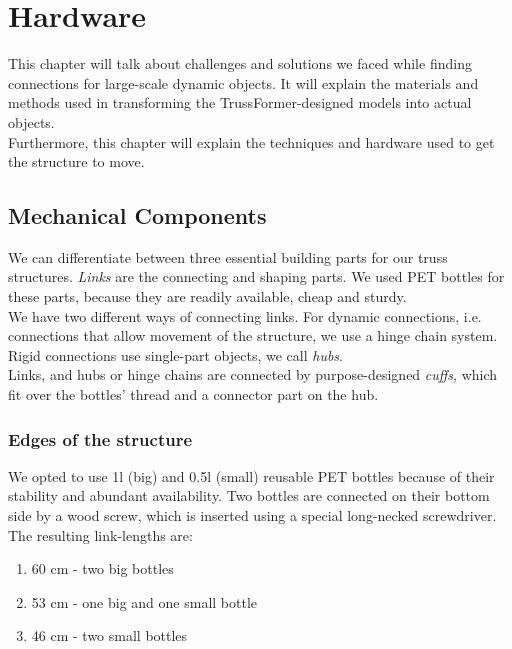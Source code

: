 \chapter{Hardware}\label{ch:hardware}
This chapter will talk about challenges and solutions we faced while finding connections for large-scale dynamic objects. It will explain the materials and methods used in transforming the TrussFormer-designed models into actual objects.\\
Furthermore, this chapter will explain the techniques and hardware used to get the structure to move.

\section{Mechanical Components}
We can differentiate between three essential building parts for our truss structures. \textit{Links} are the connecting and shaping parts. We used PET bottles for these parts, because they are readily available, cheap and sturdy.\\
We have two different ways of connecting links. For dynamic connections, i.e. connections that allow movement of the structure, we use a hinge chain system. Rigid connections use single-part objects, we call \textit{hubs}.\\
Links, and hubs or hinge chains are connected by purpose-designed \textit{cuffs}, which fit over the bottles' thread and a connector part on the hub.

\subsection{Edges of the structure}
We opted to use 1l (big) and 0.5l (small) reusable PET bottles because of their stability and abundant availability. Two bottles are connected on their bottom side by a wood screw, which is inserted using a special long-necked screwdriver. The resulting link-lengths are:
\begin{enumerate}
\item 60 cm - two big bottles
\item 53 cm - one big and one small bottle
\item 46 cm - two small bottles
\end{enumerate}

